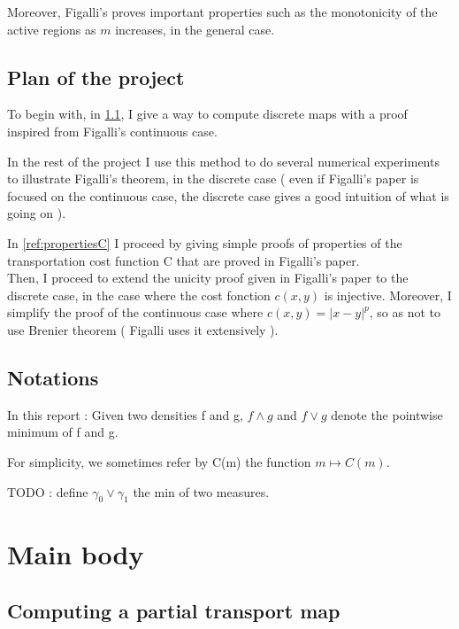 \documentclass[a4paper,11pt]{article}
\theoremstyle{definition}
\begin{document}
Moreover, Figalli's proves important properties such as the monotonicity of the active regions as $m$ increases, in the general case.

\subsection{Plan of the project}
To begin with, in \ref{sec:numerics}, I give a way to compute discrete maps with a proof inspired from Figalli's continuous case.

In the rest of the project I use this method to do several numerical experiments to illustrate Figalli's theorem, in the discrete case ( even if Figalli's paper is focused on the continuous case, the discrete case gives a good intuition of what is going on ).

In \ref{ref:propertiesC} I proceed by giving simple proofs of properties of the transportation cost function C that are proved in Figalli's paper.\\ 

Then, I proceed to extend the unicity proof given in Figalli's paper to the discrete case, in the case where the cost fonction $c(x,y)$ is injective. Moreover, I simplify the proof of the continuous case where $c(x,y) = |x-y|^p$, so as not to use Brenier theorem ( Figalli uses it extensively ).\\



\subsection{Notations}
In this report : 
Given two densities f and g, $f \wedge g$ and $f \lor g$ denote the pointwise minimum of f and g.

For simplicity, we sometimes refer by C(m) the function $m \mapsto C(m)$.

TODO : define $\gamma_0 \lor \gamma_1$ the min of two measures.
\section{Main body}

\subsection{Computing a partial transport map}\label{sec:numerics}
\end{document}
